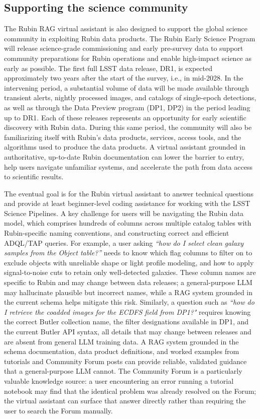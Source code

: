 \subsection{Supporting the science community}
The Rubin \gls{RAG} virtual assistant is also designed to support the global science community in exploiting Rubin data products.
The Rubin Early Science Program\cite{RTN-011} will release science-grade commissioning and early pre-survey data to support  community preparations for Rubin operations and enable high-impact science as early as possible.
The first full \gls{LSST} data release, \gls{DR1}, is expected approximately two years after the start of the survey, i.e., in mid-2028.
In the intervening period, a substantial volume of data will be made available through transient alerts, nightly processed images, and catalogs of single-epoch detections, as well as through the Data Preview program (\gls{DP1}\cite{RTN-095}, \gls{DP2}) in the period leading up to \gls{DR1}.
Each of these releases represents an opportunity for early scientific discovery with Rubin data.
During this same period, the community will also be familiarizing itself with Rubin's data products, services, access tools, and the algorithms used to produce the data products.
A virtual assistant grounded in authoritative, up-to-date Rubin documentation can lower the barrier to entry, help users navigate unfamiliar systems, and accelerate the path from data access to scientific results.

The eventual goal is for the Rubin virtual assistant to answer technical questions and provide at least beginner-level coding assistance for working with the \gls{LSST} Science Pipelines.
A key challenge for users will be navigating the Rubin data model\cite{LSE-163}, which comprises hundreds of columns across multiple catalog tables with Rubin-specific naming conventions, and constructing correct and efficient ADQL/TAP queries.
For example, a user asking \emph{``how do I select clean galaxy samples from the Object table?''} needs to know which flag columns to filter on to exclude objects with unreliable shape or light profile modeling, and how to apply signal-to-noise cuts to retain only well-detected galaxies. These column names are specific to Rubin and may change between data releases; a general-purpose LLM may hallucinate plausible but incorrect names, while a \gls{RAG} system grounded in the current schema helps mitigate this risk.
Similarly, a question such as \emph{``how do I retrieve the coadded images for the ECDFS field from DP1?"} requires knowing the correct Butler\cite{2022SPIE12189E..11J} collection name, the filter designations available in DP1, and the current Butler API syntax, all details that may change between releases and are absent from general LLM training data.
A \gls{RAG} system grounded in the schema documentation, data product definitions, and worked examples from tutorials and Community Forum posts can provide reliable, validated guidance that a general-purpose LLM cannot.
The Community Forum is a particularly valuable knowledge source: a user encountering an error running a tutorial notebook may find that the identical problem was already resolved on the Forum; the virtual assistant can surface that answer directly rather than requiring the user to search the Forum manually.

